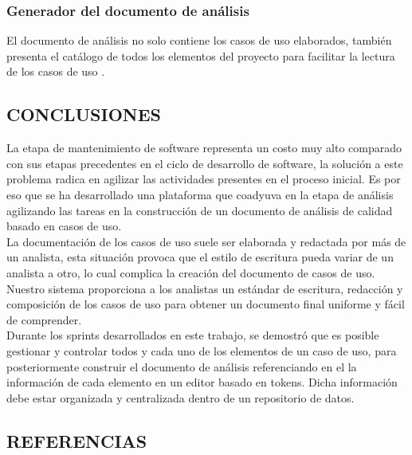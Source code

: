 \documentclass{article}
\begin{document}
\begin{multicols}{2}
	\subsubsection{Generador del documento de análisis}
	
	El documento de análisis no solo contiene los casos de uso elaborados, también presenta el catálogo de todos los elementos del proyecto para facilitar la lectura de los casos de uso .
	
	
	\subsection{CONCLUSIONES}
	
	La etapa de mantenimiento de software representa un costo muy alto comparado con sus etapas precedentes en el ciclo de desarrollo de software, la solución a este problema radica en agilizar las actividades presentes en el proceso inicial. Es por eso que se ha desarrollado una plataforma que coadyuva en la etapa de análisis agilizando las tareas en la construcción de un documento de análisis de calidad basado en casos de uso.\\
	
	La documentación de los casos de uso suele ser elaborada y redactada por más de un analista, esta situación provoca que el estilo de escritura pueda variar de un analista a otro, lo cual complica la creación del documento de casos de uso. Nuestro sistema proporciona a los analistas un estándar de escritura, redacción y composición de los casos de uso para obtener un documento final uniforme y fácil de comprender.\\
	
	Durante los sprints desarrollados en este trabajo, se demostró que es posible gestionar y controlar todos y cada uno de los elementos de un caso de uso, para posteriormente construir el documento de análisis referenciando en el la información de cada elemento en un editor basado en tokens. Dicha información debe estar organizada y centralizada dentro de un repositorio de datos.\\
	
	\subsection{REFERENCIAS}
	

\end{multicols}
\end{document}
